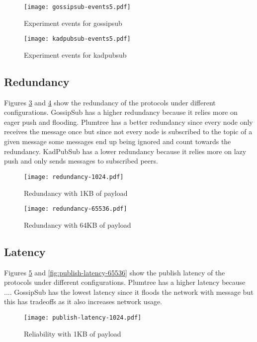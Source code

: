 \documentclass[sigconf]{acmart}
\begin{document}
\begin{figure}[htp]
    \centering
    \texttt{[image: gossipsub-events5.pdf]}
    \caption{Experiment events for gossipsub}
    \label{fig:gossipsub-events5}
\end{figure}

\begin{figure}[htp]
    \centering
    \texttt{[image: kadpubsub-events5.pdf]}
    \caption{Experiment events for kadpubsub}
    \label{fig:kadpubsub-events5}
\end{figure}


\subsection{Redundancy}
Figures \ref{fig:redundancy-1024} and \ref{fig:redundancy-65536} show the redundancy of the protocols under different configurations. GossipSub has a higher redundancy because it relies more on eager push and flooding. Plumtree has a better redundancy since every node only receives the message once but since not every node is subscribed to the topic of a given message some messages end up being ignored and count towards the redundancy. KadPubSub has a lower redundancy because it relies more on lazy push and only sends messages to subscribed peers.

\begin{figure}[htp]
    \centering
    \texttt{[image: redundancy-1024.pdf]}
    \caption{Redundancy with 1KB of payload}
    \label{fig:redundancy-1024}
\end{figure}

\begin{figure}[htp]
    \centering
    \texttt{[image: redundancy-65536.pdf]}
    \caption{Redundancy with 64KB of payload}
    \label{fig:redundancy-65536}
\end{figure}

\subsection{Latency}
Figures \ref{fig:publish-latency-1024} and \ref{fig:publish-latency-65536} show the publish latency of the protocols under different configurations. Plumtree has a higher latency because .... GossipSub has the lowest latency since it floods the network with message but this has tradeoffs as it also increases network usage.

\begin{figure}[htp]
    \centering
    \texttt{[image: publish-latency-1024.pdf]}
    \caption{Reliability with 1KB of payload}
    \label{fig:publish-latency-1024}
\end{figure}
\end{document}
